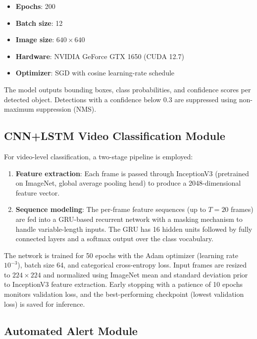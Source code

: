 \documentclass[runningheads]{llncs}
\begin{document}
\begin{itemize}
    \item \textbf{Epochs}: 200
    \item \textbf{Batch size}: 12
    \item \textbf{Image size}: $640 \times 640$
    \item \textbf{Hardware}: NVIDIA GeForce GTX 1650 (CUDA 12.7)
    \item \textbf{Optimizer}: SGD with cosine learning-rate schedule
\end{itemize}

The model outputs bounding boxes, class probabilities, and confidence scores per detected object. Detections with a confidence below 0.3 are suppressed using non-maximum suppression (NMS).

\subsection{CNN+LSTM Video Classification Module}

For video-level classification, a two-stage pipeline is employed:

\begin{enumerate}
    \item \textbf{Feature extraction}: Each frame is passed through InceptionV3 (pretrained on ImageNet, global average pooling head) to produce a 2048-dimensional feature vector.
    \item \textbf{Sequence modeling}: The per-frame feature sequences (up to $T = 20$ frames) are fed into a GRU-based recurrent network with a masking mechanism to handle variable-length inputs. The GRU has 16 hidden units followed by fully connected layers and a softmax output over the class vocabulary.
\end{enumerate}

The network is trained for 50 epochs with the Adam optimizer (learning rate $10^{-3}$), batch size 64, and categorical cross-entropy loss. Input frames are resized to $224\times224$ and normalized using ImageNet mean and standard deviation prior to InceptionV3 feature extraction. Early stopping with a patience of 10 epochs monitors validation loss, and the best-performing checkpoint (lowest validation loss) is saved for inference.

\subsection{Automated Alert Module}
\end{document}
